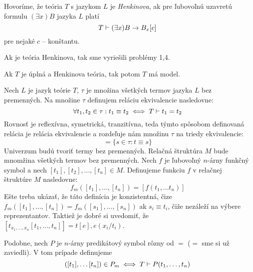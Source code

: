 \begin{definicia}
    Hovoríme, že teória $T$ s jazykom $L$ je \emph{Henkinova}, ak pre
    ľubovoľnú uzavretú formulu $(\exists x)B$ jazyka $L$ platí
    \begin{equation}
        T \vdash (\exists x)B \rightarrow B_x[c]
    \end{equation}
    pre nejaké $c$ -- konštantu.
\end{definicia}

\begin{poznamka}
    Ak je teória Henkinova, tak sme vyriešili problémy 1,4.
\end{poznamka}

\begin{lema}
    Ak $T$ je úplná a Henkinova teória, tak potom $T$ má model.
\end{lema}
\begin{dokaz}
    Nech $L$ je jazyk teórie $T$, $\tau$ je množina všetkých
    termov jazyka $L$ bez premenných. Na množine $\tau$ definujem reláciu
    ekvivalencie nasledovne:
    \begin{equation}
        \forall t_1, t_2 \in \tau :
            t_1 \equiv t_2 \iff T \vdash t_1 = t_2
    \end{equation}
    Rovnosť je reflexívna, symetrická, tranzitívna, teda týmto
    spôsobom definovaná relácia je relácia ekvivalencie a rozdeľuje
    nám množinu $\tau$ na triedy ekvivalencie:
    \begin{equation*}
        [t] = \{ s \in \tau: t \equiv s\}
    \end{equation*}
    Univerzum budú tvoriť termy bez premenných.
    Relačná štruktúra $M$ bude mnomžina všetkých termov bez premenných.
    Nech $f$ je ľubovoľný $n$-árny funkčný symbol a nech
     $[t_1], [t_2], \ldots, [t_n] \in M$. Definujeme funkciu $f$ v relačnej
     štruktúre $M$ nasledovne:
     \begin{equation*}
      f_m([t_1], \ldots, [t_n]) = [f(t_1, \ldots t_n)]
     \end{equation*}
    Ešte treba ukázať, že táto definícia je konzistentná, čize
    $f_m([t_1], \ldots, [t_n])=f_m([s_1], \ldots, [s_n])$ ak
    $s_i \equiv t_i$, čiže nezáleží na výbere reprezentantov.
    Taktiež je dobré si uvedomiť, že
    $[t_{x_1,\dots,x_n}[t_1,\dots,t_n]]=t[e], e(x_i/t_i)$.

    Podobne, nech $P$ je $n$-árny predikátový symbol rôzny od $=$ ($=$ sme
    si už zaviedli). V tom prípade definujeme
    \begin{equation*}
     ([t_1], \ldots [t_n]) \in P_m \iff T \vdash P(t_1, \ldots, t_n)
    \end{equation*}
\end{dokaz}

